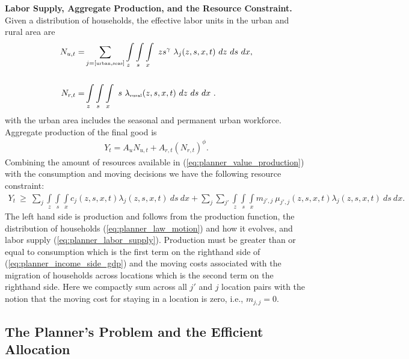 \documentclass[12pt,pdftex]{article}
\begin{document}
\begin{onehalfspacing}
\textbf{Labor Supply, Aggregate Production, and the Resource Constraint.} Given a distribution of households, the effective labor units in the urban and rural area are
\begin{align}
N_{u,t} =& \sum_{j = [\mbox{\tiny urban}, \mbox{\tiny seas}]}\int\limits_{z} \int\limits_{s} \int\limits_{x} \  z s^{\gamma} \ \lambda_j(z, s, x, t) \ dz \ ds \ dx, \nonumber 
\\
\nonumber \\
N_{r,t} =& \int\limits_{z} \int\limits_{s} \int\limits_{x} \ s \ \lambda_{\mbox{\tiny rural}}(z, s, x, t)\ dz \ ds \ dx \ .
\label{eq:planner_labor_supply}
\end{align}
with the urban area includes the seasonal and permanent urban workforce. Aggregate production of the final good is
\begin{align}
Y_t = A_u N_{u,t} + A_{r,t} \left(N_{r,t} \right)^{\phi}.
\label{eq:planner_value_production}
\end{align}
Combining the amount of resources available in (\ref{eq:planner_value_production}) with the consumption and moving decisions we have the following resource constraint:
\begin{align}
Y_t\  \geq \ \sum_{j} \int\limits_{z} \int\limits_{s} \int\limits_{x} c_{j}(z, s, x, t) \lambda_{j}(z, s, x, t) \ ds \ dx + \sum_{j}\sum_{j'} \int\limits_{z} \int\limits_{s} \int\limits_{x}  m_{j',j} \ \mu_{j',j}(z,s, x, t) \lambda_{j}(z, s, x, t) \ ds \ dx.
\label{eq:planner_income_side_gdp}
\end{align}
The left hand side is production and follows from the production function, the distribution of households (\ref{eq:planner_law_motion}) and how it evolves, and  labor supply (\ref{eq:planner_labor_supply}). Production must be greater than or equal to consumption which is the first term on the righthand side of (\ref{eq:planner_income_side_gdp}) and the moving costs associated with the migration of households across locations which is the second term on the righthand side. Here we compactly sum across all $j'$ and $j$ location pairs with the notion that the moving cost for staying in a location is zero, i.e., $m_{j,j} = 0$.

\subsection{The Planner's Problem and the Efficient Allocation}


\end{onehalfspacing}
\end{document}
